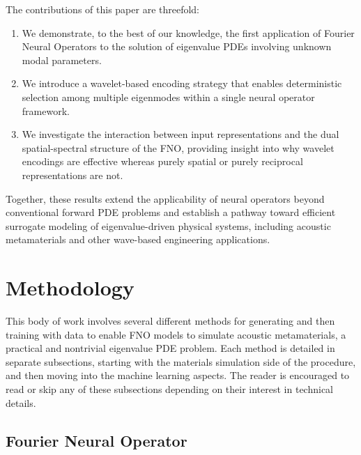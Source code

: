 \documentclass[preprint,review,12pt]{elsarticle}
\begin{document}
The contributions of this paper are threefold:

\begin{enumerate}
    \item We demonstrate, to the best of our knowledge, the first application of Fourier Neural Operators to the solution of eigenvalue PDEs involving unknown modal parameters. 
    
    \item We introduce a wavelet-based encoding strategy that enables deterministic selection among multiple eigenmodes within a single neural operator framework.
    
    \item We investigate the interaction between input representations and the dual spatial-spectral structure of the FNO, providing insight into why wavelet encodings are effective whereas purely spatial or purely reciprocal representations are not.
\end{enumerate}

Together, these results extend the applicability of neural operators beyond conventional forward PDE problems and establish a pathway toward efficient surrogate modeling of eigenvalue-driven physical systems, including acoustic metamaterials and other wave-based engineering applications.

\section{Methodology}
\label{sec:Methodology}
This body of work involves several different methods for generating and then training with data to enable FNO models to simulate acoustic metamaterials, a practical and nontrivial eigenvalue PDE problem. Each method is detailed in separate subsections, starting with the materials simulation side of the procedure, and then moving into the machine learning aspects. The reader is encouraged to read or skip any of these subsections depending on their interest in technical details.

\subsection{Fourier Neural Operator}
\label{ssec:fourier_neural_operator}
\end{document}

